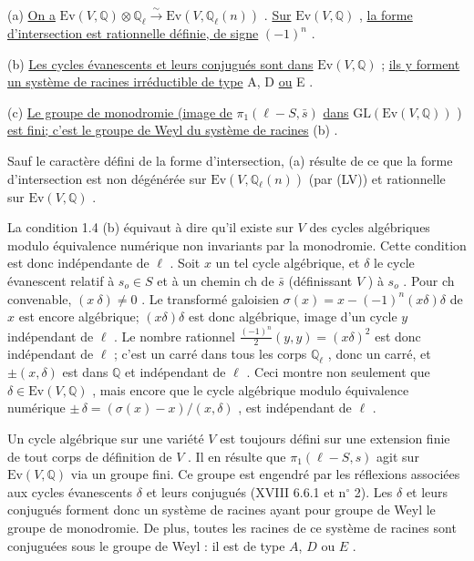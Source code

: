 (a) \underline{On a} $\mathrm{Ev}(V, \mathbb{Q}) \otimes \mathbb{Q}_\ell \stackrel{\sim}{\longrightarrow} \mathrm{Ev}(V, \mathbb{Q}_\ell(n))$ . \underline{Sur} $\mathrm{Ev}(V, \mathbb{Q})$ , \underline{la forme d'intersection est rationnelle définie, de signe} $(-1)^n$ .

(b) \underline{Les cycles évanescents et leurs conjugués sont dans} $\mathrm{Ev}(V, \mathbb{Q})$ ; \underline{ils y forment un système de racines irréductible de type} A, D \underline{ou} E .

(c) \underline{Le groupe de monodromie (image de} $\pi_1(\ell - S, \bar{s})$ \underline{dans} $\mathrm{GL}(\mathrm{Ev}(V, \mathbb{Q}))$ ) \underline{est fini; c'est le groupe de Weyl du système de racines} (b) .

Sauf le caractère défini de la forme d'intersection, (a) résulte de ce que la forme d'intersection est non dégénérée sur $\mathrm{Ev}(V, \mathbb{Q}_\ell(n))$ (par (LV)) et rationnelle sur $\mathrm{Ev}(V, \mathbb{Q})$ .

La condition 1.4 (b) équivaut à dire qu'il existe sur $V$ des cycles algébriques modulo équivalence numérique non invariants par la monodromie. Cette condition est donc indépendante de $\ell$ . Soit $x$ un tel cycle algébrique, et $\delta$ le cycle évanescent relatif à $s_o \in S$ et à un chemin ch de $\bar{s}$ (définissant $V$ ) à $s_o$ . Pour ch convenable, $(x\ \delta) \neq 0$ . Le transformé galoisien $\sigma(x) = x-(-1)^n(x\delta)\delta$ de $x$ est encore algébrique; $(x\delta)\delta$ est donc algébrique, image d'un cycle $y$ indépendant de $\ell$ . Le nombre rationnel $\frac{(-1)^n}{2}(y, y) = (x\delta)^2$ est donc indépendant de $\ell$ ; c'est un carré dans tous les corps $\mathbb{Q}_\ell$ , donc un carré, et $\pm (x, \delta)$ est dans $\mathbb{Q}$ et indépendant de $\ell$ . Ceci montre non seulement que $\delta \in \mathrm{Ev}(V, \mathbb{Q})$ , mais encore que le cycle algébrique modulo équivalence numérique $\pm\, \delta = (\sigma(x) -x)/(x, \delta)$ , est indépendant de $\ell$ .



Un cycle algébrique sur une variété $V$ est toujours défini sur une extension finie de tout corps de définition de $V$ . Il en résulte que $\pi_1(\ell - S, s)$ agit sur $\mathrm{Ev}(V, \mathbb{Q})$ via un groupe fini. Ce groupe est engendré par les réflexions associées aux cycles évanescents $\delta$ et leurs conjugués (XVIII 6.6.1 et n$^\circ$ 2). Les $\delta$ et leurs conjugués forment donc un système de racines ayant pour groupe de Weyl le groupe de monodromie. De plus, toutes les racines de ce système de racines sont conjuguées sous le groupe de Weyl : il est de type $A$, $D$ ou $E$ .

